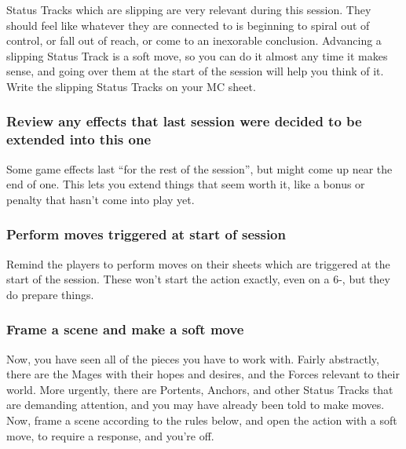\documentclass[
  oneside,
  statementpaper,
  9pt]{memoir}
\begin{document}
Status Tracks which are slipping are very relevant during this session.
They should feel like whatever they are connected to is beginning to
spiral out of control, or fall out of reach, or come to an inexorable
conclusion. Advancing a slipping Status Track is a soft move, so you can
do it almost any time it makes sense, and going over them at the start
of the session will help you think of it. Write the slipping Status
Tracks on your MC sheet.

\hypertarget{review-any-effects-that-last-session-were-decided-to-be-extended-into-this-one}{%
\subsubsection{Review any effects that last session were decided to be
extended into this
one}\label{review-any-effects-that-last-session-were-decided-to-be-extended-into-this-one}}

Some game effects last ``for the rest of the session'', but might come
up near the end of one. This lets you extend things that seem worth it,
like a bonus or penalty that hasn't come into play yet.

\hypertarget{perform-moves-triggered-at-start-of-session}{%
\subsubsection{Perform moves triggered at start of
session}\label{perform-moves-triggered-at-start-of-session}}

Remind the players to perform moves on their sheets which are triggered
at the start of the session. These won't start the action exactly, even
on a 6-, but they do prepare things.

\hypertarget{frame-a-scene-and-make-a-soft-move}{%
\subsubsection{Frame a scene and make a soft
move}\label{frame-a-scene-and-make-a-soft-move}}

Now, you have seen all of the pieces you have to work with. Fairly
abstractly, there are the Mages with their hopes and desires, and the
Forces relevant to their world. More urgently, there are Portents,
Anchors, and other Status Tracks that are demanding attention, and you
may have already been told to make moves. Now, frame a scene according
to the rules below, and open the action with a soft move, to require a
response, and you're off.
\end{document}
